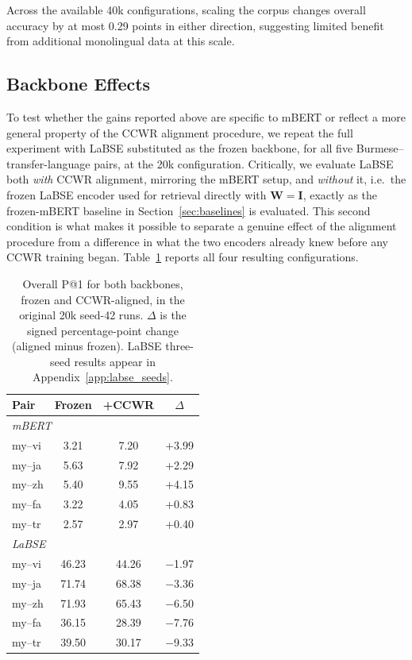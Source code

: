 \documentclass[11pt]{article}
\begin{document}
Across the available 40k configurations, scaling the corpus changes overall accuracy by at most 0.29 points in either direction, suggesting limited benefit from
additional monolingual data at this scale.

\subsection{Backbone Effects}
\label{sec:backbone_comparison}

To test whether the gains reported above are specific to mBERT or reflect a more general property of the CCWR alignment procedure, we repeat the full experiment with LaBSE substituted as the frozen backbone, for all five Burmese--transfer-language pairs, at the 20k configuration. Critically, we evaluate LaBSE both \emph{with} CCWR alignment, mirroring the mBERT setup, and \emph{without} it, i.e.\ the frozen LaBSE encoder used for retrieval directly with $\mathbf{W} = \mathbf{I}$, exactly as the frozen-mBERT baseline in Section~\ref{sec:baselines} is evaluated. This second condition is what makes it possible to separate a genuine effect of the alignment procedure from a difference in what the two encoders already knew before any CCWR training began. Table~\ref{tab:labse_comparison} reports all four resulting configurations.

\begin{table}[h]
\centering
\small
\caption{Overall P@1 for both backbones, frozen and CCWR-aligned, in the original 20k seed-42 runs. $\Delta$ is the signed percentage-point change
(aligned minus frozen). LaBSE three-seed results appear in Appendix~\ref{app:labse_seeds}.}
\label{tab:labse_comparison}
\begin{tabular}{lccc}
\toprule
\textbf{Pair} & \textbf{Frozen} & \textbf{+CCWR} & \textbf{$\Delta$} \\
\midrule
\multicolumn{4}{l}{\emph{mBERT}} \\
my--vi & 3.21  & 7.20  & +3.99 \\
my--ja & 5.63  & 7.92  & +2.29 \\
my--zh & 5.40  & 9.55  & +4.15 \\
my--fa & 3.22  & 4.05  & +0.83 \\
my--tr & 2.57  & 2.97  & +0.40 \\
\midrule
\multicolumn{4}{l}{\emph{LaBSE}} \\
my--vi & 46.23 & 44.26 & $-$1.97 \\
my--ja & 71.74 & 68.38 & $-$3.36 \\
my--zh & 71.93 & 65.43 & $-$6.50 \\
my--fa & 36.15 & 28.39 & $-$7.76 \\
my--tr & 39.50 & 30.17 & $-$9.33 \\
\bottomrule
\end{tabular}
\end{table}
\end{document}
